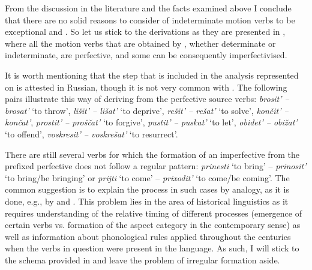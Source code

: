 From the discussion in the literature and the facts examined above I conclude that there are no solid reasons to consider  of indeterminate motion verbs to be exceptional and . So let us stick to the derivations as they are presented in , where all the motion verbs that are obtained by , whether determinate or indeterminate, are perfective, and some can be consequently imperfectivised.

It is worth mentioning that the  step that is included in the analysis represented on  is attested in Russian, though it is not very common with . The following pairs illustrate this way of deriving  from the perfective source verbs: \textit{brosit'\textsuperscript{\PF} -- brosat'\textsuperscript{\IPF}} `to throw', \textit{li\v{s}it'\textsuperscript{\PF} -- li\v{s}at'\textsuperscript{\IPF}} `to deprive', \textit{re\v{s}it'\textsuperscript{\PF} -- re\v{s}at'\textsuperscript{\IPF}} `to solve', \textit{kon\v{c}it'\textsuperscript{\PF} -- kon\v{c}at'\textsuperscript{\IPF}}, \textit{prostit'\textsuperscript{\PF} -- pro\v{s}\v{c}at'\textsuperscript{\IPF}} `to forgive', \textit{pustit'\textsuperscript{\PF} -- puskat'\textsuperscript{\IPF}} `to let', \textit{obidet'\textsuperscript{\PF} -- obi\v{z}at'\textsuperscript{\IPF}} `to offend', \textit{voskresit'\textsuperscript{\PF} -- voskre\v{s}at'\textsuperscript{\IPF}} `to resurrect'.

There are still several verbs for which the formation of an imperfective from the prefixed perfective does not follow a regular pattern: \textit{prinesti}\textsuperscript{\PF} `to bring' -- \textit{prinosit'}\textsuperscript{\IPF} `to bring/be bringing' or \textit{prijti}\textsuperscript{\PF} `to come' -- \textit{prixodit'}\textsuperscript{\IPF} `to come/be coming'. The common suggestion is to explain the  process in such cases by analogy, as it is done, e.g., by \citet{Regnell:44} and \citet[589]{Shvedova:82}. This problem lies in the area of historical linguistics as it requires understanding of the relative timing of different processes (emergence of certain verbs vs. formation of the aspect category in the contemporary sense) as well as information about phonological rules applied throughout the centuries when the verbs in question were present in the language. As such, I will stick to the schema provided in  and leave the problem of irregular  formation aside.

